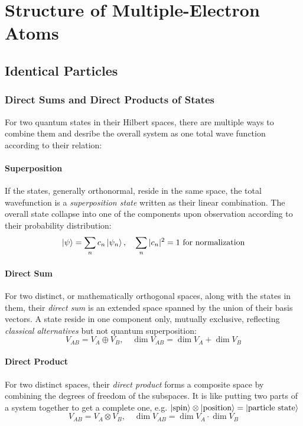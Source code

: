 \chapter{Structure of Multiple-Electron Atoms}



\section{Identical Particles}

\subsection{Direct Sums and Direct Products of States}\label{direct sum}

For two quantum states in their Hilbert spaces, 
there are multiple ways to combine them and desribe the overall system as one total wave function according to their relation:

\subsubsection{Superposition}

If the states, generally orthonormal, reside in the same space, the total wavefunction is a \emph{superposition state} written as their linear combination. The overall state collapse into one of the components upon observation according to their probability distribution:
\[
\ket{\psi} = \sum_{n}c_n\ket{\psi_n},
\quad\sum_{n}|c_n|^2=1\text{ for normalization}
\]

\subsubsection{Direct Sum}

For two distinct, or mathematically orthogonal spaces, along with the states in them, their \emph{direct sum} is an extended space spanned by the union of their basis vectors. A state reside in one component only, mutually exclusive, reflecting \emph{classical alternatives} but not quantum superposition:
\[V_{AB} = V_A \oplus V_B, \quad \dim V_{AB} = \dim V_A + \dim V_B\]

\subsubsection{Direct Product}

For two distinct spaces, their \emph{direct product} forms a composite space by combining the degrees of freedom of the subspaces. 
It is like putting two parts of a system together to get a complete one, e.g.
$\ket{\text{spin}} \otimes \ket{\text{position}} = \ket{\text{particle state}}$
\[V_{AB} = V_A \otimes V_B, \quad \dim V_{AB} = \dim V_A \cdot \dim V_B\]


